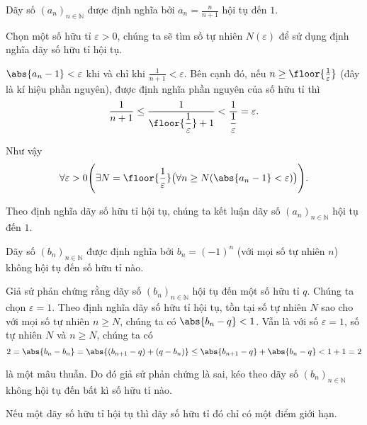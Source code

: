 \begin{example}
    Dãy số ${(a_{n})}_{n\in\mathbb{N}}$ được định nghĩa bởi $a_{n} = \frac{n}{n+1}$ hội tụ đến $1$.

    Chọn một số hữu tỉ $\varepsilon > 0$, chúng ta sẽ tìm số tự nhiên $N(\varepsilon)$ để sử dụng định nghĩa dãy số hữu tỉ hội tụ.

    $\abs{a_{n} - 1} < \varepsilon$ khi và chỉ khi $\frac{1}{n+1} < \varepsilon$. Bên cạnh đó, nếu $n \geq \floor{\frac{1}{\varepsilon}}$ (đây là kí hiệu phần nguyên), được định nghĩa phần nguyên của số hữu tỉ thì
    \[
        \frac{1}{n+1}\leq \frac{1}{\floor{\dfrac{1}{\varepsilon}} + 1} < \frac{1}{\dfrac{1}{\varepsilon}} = \varepsilon.
    \]

    Như vậy
    \[
        \forall\varepsilon > 0 \Biggl( \exists N=\floor{\frac{1}{\varepsilon}}\bigl(\forall n\geq N ( \abs{a_{n} - 1} < \varepsilon )\bigr) \Biggr).
    \]

    Theo định nghĩa dãy số hữu tỉ hội tụ, chúng ta kết luận dãy số ${(a_{n})}_{n\in\mathbb{N}}$ hội tụ đến $1$.
\end{example}

\begin{counterexample}
    Dãy số ${(b_{n})}_{n\in\mathbb{N}}$ được định nghĩa bởi $b_{n} = {(-1)}^{n}$ (với mọi số tự nhiên $n$) không hội tụ đến số hữu tỉ nào.

    Giả sử phản chứng rằng dãy số ${(b_{n})}_{n\in\mathbb{N}}$ hội tụ đến một số hữu tỉ $q$. Chúng ta chọn $\varepsilon = 1$. Theo định nghĩa dãy số hữu tỉ hội tụ, tồn tại số tự nhiên $N$ sao cho với mọi số tự nhiên $n\geq N$, chúng ta có $\abs{b_{n} - q} < 1$. Vẫn là với số $\varepsilon = 1$, số tự nhiên $N$ và $n\ge N$, chúng ta có
    \[
        2 = \abs{b_{n} - b_{n}} = \abs{(b_{n+1} - q) + (q - b_{n})} \leq \abs{b_{n+1} - q} + \abs{b_{n} - q} < 1 + 1 = 2
    \]

    là một mâu thuẫn. Do đó giả sử phản chứng là sai, kéo theo dãy số ${(b_{n})}_{n\in\mathbb{N}}$ không hội tụ đến bất kì số hữu tỉ nào.
\end{counterexample}

\begin{theorem}\label{theorem:uniqueness-of-limit-points-of-convergence-rational-sequences}
    Nếu một dãy số hữu tỉ hội tụ thì dãy số hữu tỉ đó chỉ có một điểm giới hạn.
\end{theorem}

